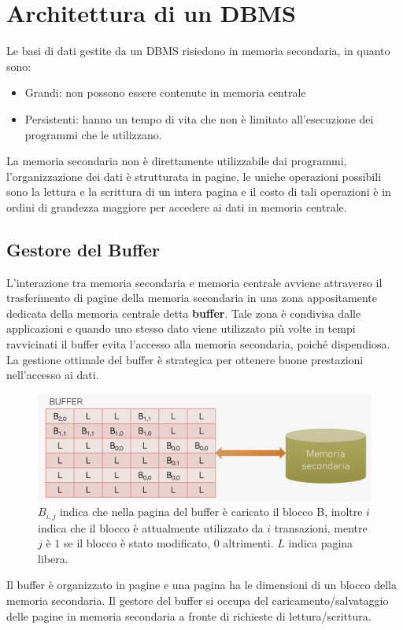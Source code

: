 \documentclass[oneside,a4paper,11pt]{book}
\theoremstyle{italicstyle}
\theoremstyle{normStyle}
\begin{document}
\section{Architettura di un DBMS}
Le basi di dati gestite da un DBMS risiedono in memoria secondaria, in 
quanto sono:
\begin{itemize}
    \item Grandi: non possono essere contenute in memoria centrale
    \item Persistenti: hanno un tempo di vita che non è limitato all'esecuzione 
    dei programmi che le utilizzano.
\end{itemize}
La memoria secondaria non è direttamente utilizzabile dai programmi, 
l'organizzazione dei dati è strutturata in pagine, le uniche operazioni 
possibili sono la lettura e la scrittura di un intera pagina e il costo 
di tali operazioni è in ordini di grandezza maggiore per accedere ai 
dati in memoria centrale.
\subsection{Gestore del Buffer}
L'interazione tra memoria secondaria e memoria centrale avviene attraverso 
il trasferimento di pagine della memoria secondaria in una zona appositamente 
dedicata della memoria centrale detta \textbf{buffer}. Tale zona è 
condivisa dalle applicazioni e quando uno stesso dato viene utilizzato 
più volte in tempi ravvicinati il buffer evita l'accesso alla memoria secondaria,
poiché dispendiosa. La gestione ottimale del buffer è strategica per ottenere 
buone prestazioni nell'accesso ai dati.
\begin{figure}[H]
    \centering
    \includegraphics[width=15cm]{img/buffer.jpeg}
    \caption{$B_{i,j}$ indica che nella pagina del buffer è caricato 
    il blocco B, inoltre $i$ indica che il blocco è attualmente 
    utilizzato da $i$ transazioni, mentre $j$ è $1$ se il blocco è stato modificato,
    $0$ altrimenti. $L$ indica pagina libera.}
    \label{fig:buffer}
  \end{figure}
Il buffer è organizzato in pagine e una pagina ha le dimensioni di un blocco della memoria
secondaria. Il gestore del buffer si occupa del caricamento/salvataggio delle pagine in 
memoria secondaria a fronte di richieste di lettura/scrittura.
\end{document}
